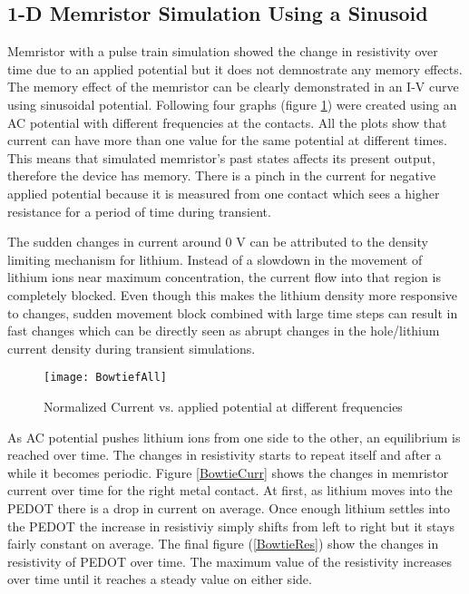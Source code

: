 \begin{doublespace}
\clearpage
\subsection{1-D Memristor Simulation Using a Sinusoid}

Memristor with a pulse train simulation showed the change in resistivity over time due to an applied potential but it does not demnostrate any memory effects. The memory effect of the memristor can be clearly demonstrated in an I-V curve using sinusoidal potential. Following four graphs (figure \ref{Bowtie}) were created using an AC potential with different frequencies at the contacts. All the plots show that current can have more than one value for the same potential at different times. This means that simulated memristor's past states affects its present output, therefore the device has memory. There is a pinch in the current for negative applied potential because it is measured from one contact which sees a higher resistance for a period of time during transient. 

The sudden changes in current around 0 V can be attributed to the density limiting mechanism for lithium. Instead of a slowdown in the movement of lithium ions near maximum concentration, the current flow into that region is completely blocked. Even though this makes the lithium density more responsive to changes, sudden movement block combined with large time steps can result in fast changes which can be directly seen as abrupt changes in the hole/lithium current density during transient simulations.  

\begin{figure}[!htp]
\centering
\texttt{[image: BowtiefAll]}
\caption{Normalized Current vs. applied potential at different frequencies} 
\label{Bowtie}
\end{figure}

As AC potential pushes lithium ions from one side to the other, an equilibrium is reached over time. The changes in resistivity starts to repeat itself and after a while it becomes  periodic. Figure \ref{BowtieCurr} shows the changes in memristor current over time for the right metal contact. At first, as lithium moves into the PEDOT there is a drop in current on average. Once enough lithium settles into the PEDOT the increase in resistiviy simply shifts from left to right but it stays fairly constant on average. The final figure (\ref{BowtieRes}) show the changes in resistivity of PEDOT over time. The maximum value of the resistivity increases over time until it reaches a steady value on either side.



\end{doublespace}
